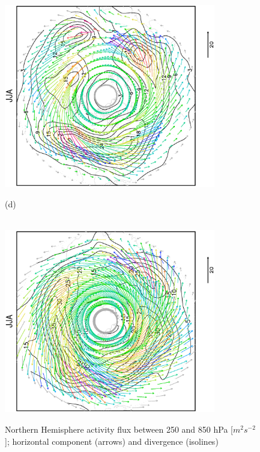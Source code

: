 \documentclass[12pt,a4paper,twoside,openright,headinclude,liststotoc,bibtotoc]{scrreprt}
\begin{document}
\begin{figure}[c]
{\includegraphics[height=8.0cm,angle=-90]
{eps/north_JJA_PFLX_TMEAN1.eps}
}
\parbox{8.5cm}{\hspace{0.95cm}\begin{scriptsize}(d)\end{scriptsize} \vspace{-0.5cm} \\
\includegraphics[height=8.0cm,angle=-90]
{eps/dailyERA_north_JJA_PFLX_TMEAN.eps}
}
\caption[Activity flux-Northern Hemisphere]{Northern Hemisphere activity flux between 250 and 850 hPa [$m^{2}s^{-2}$]; horizontal component (arrows) and divergence (isolines)}
\label{img:plumbnorth}
\end{figure}
\end{document}
